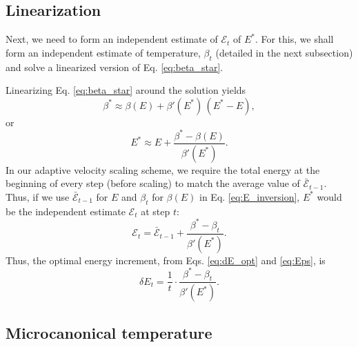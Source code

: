 \documentclass[reprint]{revtex4-1}
\begin{document}
\subsection{Linearization}



Next, we need to form an independent estimate of
$\mathcal E_t$ of $E^*$.
%
For this, we shall form
an independent estimate of temperature, $\beta_t$
(detailed in the next subsection)
and solve a linearized version of Eq. \eqref{eq:beta_star}.

Linearizing Eq. \eqref{eq:beta_star} around the solution
yields
%
\begin{equation*}
\beta^*
\approx
\beta( E )
+
\beta'( E^* ) \, ( E^* - E )
,
\end{equation*}
%
or
%
\begin{equation}
E^*
\approx
E
+
\frac{ \beta^* - \beta(E) }
     { \beta'(E^*) }
.
\label{eq:E_inversion}
\end{equation}
%
In our adaptive velocity scaling scheme,
we require the total energy at the beginning of every step
(before scaling) to match the average value of
$\bar{\mathcal E}_{t - 1}$.
%
Thus, if we use $\bar{\mathcal E}_{t - 1}$ for $E$
and $\beta_t$ for $\beta(E)$
in Eq. \eqref{eq:E_inversion},
$E^*$ would be the independent estimate
$\mathcal E_{t}$ at step $t$:
%
%
\begin{equation}
\mathcal E_t
=
\bar{\mathcal E}_{t - 1}
+
\frac{ \beta^* - \beta_t }
     { \beta'(E^*) }
.
\label{eq:Eps}
\end{equation}
%
Thus, the optimal energy increment,
from Eqs. \eqref{eq:dE_opt} and \eqref{eq:Eps},
is
%
\begin{equation}
\delta E_t
=
\frac{ 1 } { t }
\cdot
\frac{ \beta^* - \beta_t }
     { \beta'(E^*) }
.
\label{eq:dE_beta}
\end{equation}
%



\subsection{Microcanonical temperature}
\end{document}
